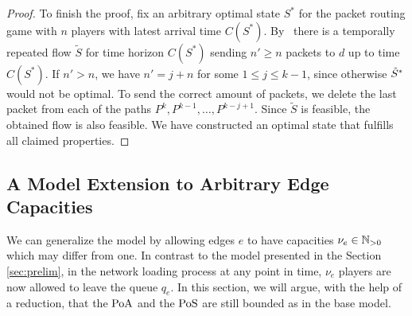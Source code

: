 \begin{proof}
    To finish the proof, fix an arbitrary optimal state $S^*$ for the packet routing game with $n$ players with latest arrival time $C(S^*)$. By~\cite{ford1958constructing} there is a temporally repeated flow $\tilde{S}$ for time horizon $C(S^*)$ sending $n'\geq n$ packets to $d$ up to time $C(S^*)$. If $n'> n$, we have $n' = j + n$ for some $1\leq j\leq k-1$, since otherwise $\Tilde{S}^*$ would not be optimal. To send the correct amount of packets, we delete the last packet from each of the paths $P^k,P^{k-1},\ldots, P^{k-j+1}$. Since $\tilde{S}$ is feasible, the obtained flow is also feasible. We have constructed an optimal state that fulfills all claimed properties.
\end{proof}

\subsection{A Model Extension to Arbitrary Edge Capacities}\label{sec:edgcap}
We can generalize the model by allowing edges $e$ to have capacities $\nu_e\in \mathbb{N}_{>0}$ which may differ from one. In contrast to the model presented in the Section \ref{sec:prelim}, in the network loading process at any point in time, $\nu_e$ players are now allowed to leave the queue $q_e$. In this section, we will argue, with the help of a reduction, that the $\operatorname*{PoA}$ and the $\operatorname*{PoS}$ are still bounded as in the base model.

